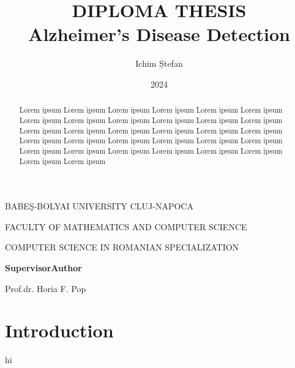 \documentclass[a4paper, 12pt]{article}
\title{
    DIPLOMA THESIS \\
    Alzheimer's Disease Detection
}
\author{Ichim Ștefan}
\date{2024}
\makeatletter
\renewcommand{\maketitle}{
    \begin{center}
            \normalsize{BABEŞ-BOLYAI UNIVERSITY CLUJ-NAPOCA}\par %
            \normalsize{FACULTY OF MATHEMATICS AND COMPUTER SCIENCE}\par %
            \normalsize{COMPUTER SCIENCE IN ROMANIAN SPECIALIZATION}\par
        \vspace{16em} %

        {\LARGE\@title\par} %
        \vspace{16em} %

        \textbf{Supervisor}\hspace{20em}\textbf{Author}\par
        Prof.dr. Horia F. Pop\hspace{16em}{\large\@author\par} %
        \vspace{3em} %

        {\large\@date\par} %
    \end{center}
}
\makeatother
\begin{document}
\maketitle
\newpage

\begin{abstract}
    Lorem ipsum Lorem ipsum Lorem ipsum Lorem ipsum
    Lorem ipsum Lorem ipsum Lorem ipsum Lorem ipsum
    Lorem ipsum Lorem ipsum Lorem ipsum Lorem ipsum
    Lorem ipsum Lorem ipsum Lorem ipsum Lorem ipsum
    Lorem ipsum Lorem ipsum Lorem ipsum Lorem ipsum
    Lorem ipsum Lorem ipsum Lorem ipsum Lorem ipsum
    Lorem ipsum Lorem ipsum Lorem ipsum Lorem ipsum
    Lorem ipsum Lorem ipsum Lorem ipsum Lorem ipsum
\end{abstract}
\newpage

\tableofcontents
\newpage

\section{Introduction}
hi \cite{example-article, example-book}

\newpage

\end{document}
